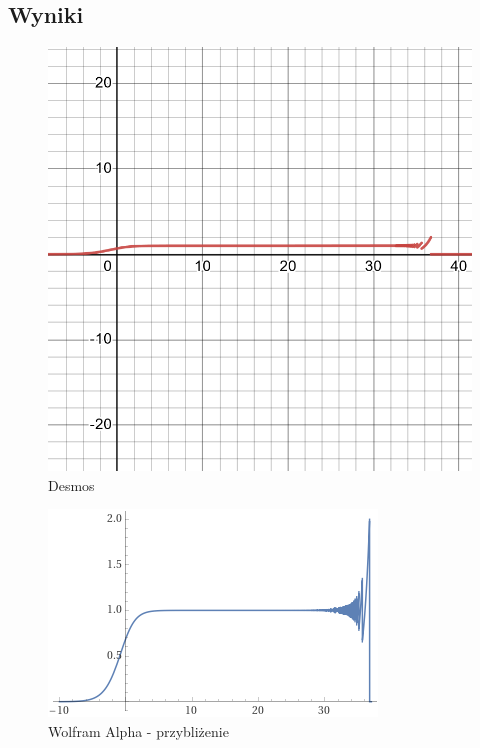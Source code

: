 \documentclass[10pt,a4paper, polish]{article}
\begin{document}
\subsection*{Wyniki}
\begin{figure}[H]
\caption{Desmos}
\centering
\includegraphics[scale=0.2]{plots/ex2/desmos.png}
\end{figure}
\begin{figure}[H]
\caption{Wolfram Alpha - przybliżenie}
\centering
\includegraphics[scale=0.5]{plots/ex2/wolfram-alpha-closeup.png}
\end{figure}
\end{document}
